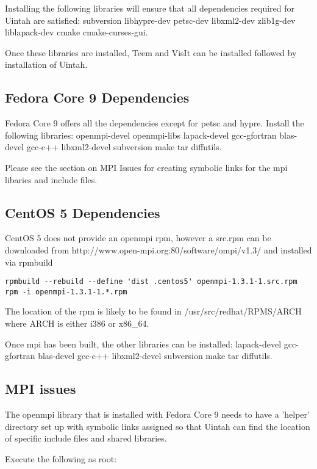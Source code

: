 Installing the following libraries will ensure that all dependencies
required for Uintah are satisfied: subversion libhypre-dev petsc-dev
libxml2-dev zlib1g-dev liblapack-dev cmake cmake-curses-gui.

Once these libraries are installed, Teem and VisIt can be installed
followed by installation of Uintah.

\subsection{Fedora Core 9 Dependencies}

Fedora Core 9 offers all the dependencies except for petsc and hypre.
Install the following libraries: openmpi-devel openmpi-libs
lapack-devel gcc-gfortran blas-devel gcc-c++ libxml2-devel subversion
make tar diffutils.  

Please see the section on MPI Issues for creating symbolic links for
the mpi libaries and include files.

\subsection{CentOS 5 Dependencies}

CentOS 5 does not provide an openmpi rpm, however a src.rpm can be
downloaded from http://www.open-mpi.org:80/software/ompi/v1.3/ and
installed via rpmbuild

\begin{Verbatim}
rpmbuild --rebuild --define 'dist .centos5' openmpi-1.3.1-1.src.rpm
rpm -i openmpi-1.3.1-1.*.rpm
\end{Verbatim}

The location of the rpm is likely to be found in
/usr/src/redhat/RPMS/ARCH where ARCH is either i386 or x86\_64.

Once mpi has been built, the other libraries can be installed:
lapack-devel gcc-gfortran blas-devel gcc-c++ libxml2-devel subversion
make tar diffutils.

\subsection{MPI issues}

The openmpi library that is installed with Fedora Core 9 needs to have
a 'helper' directory set up with symbolic links assigned so that
Uintah can find the location of specific include files and shared
libraries.

Execute the following as root:

